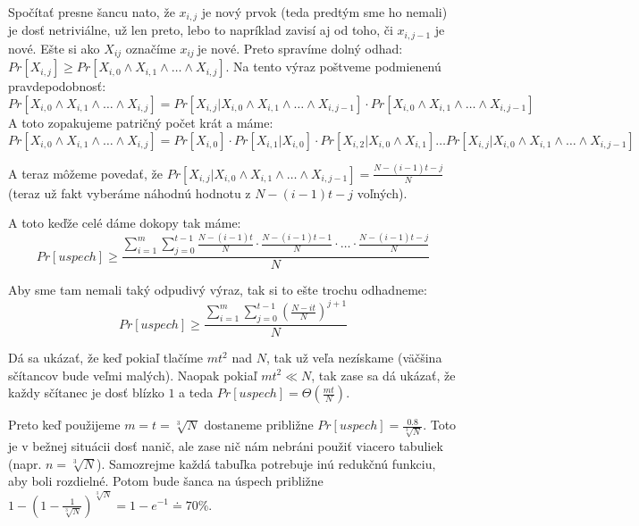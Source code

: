 Spočítať presne šancu nato, že $x_{i,j}$ je nový prvok 
(teda predtým sme ho nemali) je dosť netriviálne,
už len preto, lebo to napríklad zavisí aj od toho, či $x_{i,j-1}$ je nové.
Ešte si ako $X_{ij}$ označíme $x_{ij} ~\text{je nové}$.
Preto spravíme dolný odhad:
$Pr[X_{i,j}] \geq Pr[X_{i,0}\land X_{i,1} \land \dots \land X_{i,j}]$.
Na tento výraz poštveme podmienenú pravdepodobnosť:
\begin{equation*}
    Pr[X_{i,0} \land X_{i,1} \land \dots \land X_{i,j}] = 
    Pr[X_{i,j} | X_{i,0} \land X_{i,1} \land \dots \land X_{i,j-1} ]
    \cdot
    Pr[X_{i,0} \land X_{i,1} \land \dots \land X_{i,j-1} ]
\end{equation*}
A toto zopakujeme patričný počet krát a máme:
\begin{equation*}
    Pr[X_{i,0} \land X_{i,1} \land \dots \land X_{i,j}] =
    Pr[X_{i,0}] \cdot Pr[X_{i,1} | X_{i,0}] 
    \cdot Pr[X_{i,2} | X_{i,0} \land X_{i,1}] \dots
    Pr[X_{i,j} | X_{i,0} \land X_{i,1} \land \dots \land X_{i,j-1}]
\end{equation*}

A teraz môžeme povedať, že
$Pr[X_{i,j} | X_{i,0} \land X_{i,1} \land \dots \land X_{i,j-1}] =
    \frac{N - (i-1)t - j}{N}$
(teraz už fakt vyberáme náhodnú hodnotu z $N - (i-1)t - j$ voľných). 

A toto keďže celé dáme dokopy tak máme:
\begin{equation*}
    Pr[uspech] \geq \frac{\displaystyle
        \sum_{i=1}^m \sum_{j=0}^{t-1}
            \frac{N - (i-1)t}{N} \cdot \frac{N - (i-1)t - 1}{N} \cdot \dots
            \cdot \frac{N - (i-1)t - j}{N}
        }{N}
\end{equation*}

Aby sme tam nemali taký odpudivý výraz, tak si to ešte trochu odhadneme:
\begin{equation*}
    Pr[uspech] \geq \frac{\displaystyle
        \sum_{i=1}^m \sum_{j=0}^{t-1} \left ( \frac{N - it}{N} \right )^{j+1}
        }{N}
\end{equation*}

Dá sa ukázať, že keď pokiaľ tlačíme $mt^2$ nad $N$, tak už veľa nezískame
(väčšina sčítancov bude veľmi malých).
Naopak pokiaľ $mt^2 \ll N$, tak zase sa dá ukázať,
že každy sčítanec je dosť blízko $1$ a teda 
$Pr[uspech] = \Theta\left(\frac{mt}{N}\right)$.

Preto keď použijeme $m=t=\sqrt[3]{N}$ dostaneme približne 
$Pr[uspech] = \frac{0.8}{\sqrt[3]{N}}$.
Toto je v bežnej situácii dosť nanič, ale zase nič nám nebráni
použiť viacero tabuliek (napr. $n = \sqrt[3]{N}$). 
Samozrejme každá tabuľka potrebuje inú redukčnú funkciu, aby boli rozdielné.
Potom bude šanca na úspech približne
$1 - (1 - \frac{1}{\sqrt[3]{N}})^{\sqrt[3]{N}} = 1-e^{-1} \doteq 70\%$.

